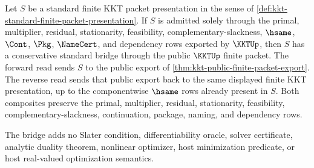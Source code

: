 \begin{theorem}
\label{thm:kkt-finite-packet-standard-bridge}
Let $S$ be a standard finite KKT packet presentation in the sense of \autoref{def:kkt-standard-finite-packet-presentation}. If $S$ is admitted solely through the primal, multiplier, residual, stationarity, feasibility, complementary-slackness, $\hsame$, $\Cont$, $\Pkg$, $\NameCert$, and dependency rows exported by $\KKTUp$, then $S$ has a conservative standard bridge through the public $\KKTUp$ finite packet. The forward read sends $S$ to the public export of \autoref{thm:kkt-public-finite-packet-export}. The reverse read sends that public export back to the same displayed finite KKT presentation, up to the componentwise $\hsame$ rows already present in $S$. Both composites preserve the primal, multiplier, residual, stationarity, feasibility, complementary-slackness, continuation, package, naming, and dependency rows.

The bridge adds no Slater condition, differentiability oracle, solver certificate, analytic duality theorem, nonlinear optimizer, host minimization predicate, or host real-valued optimization semantics.
\end{theorem}
